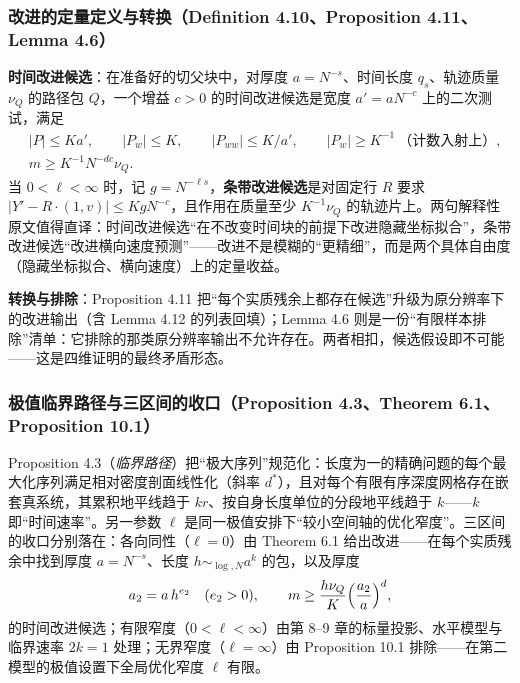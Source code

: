 \subsubsection*{改进的定量定义与转换（Definition 4.10、Proposition 4.11、Lemma 4.6）}

\textbf{时间改进候选}：在准备好的切父块中，对厚度 $a=N^{-s}$、时间长度 $q_s$、轨迹质量 $\nu_Q$ 的路径包 $Q$，一个增益 $c>0$ 的时间改进候选是宽度 $a'=aN^{-c}$ 上的二次测试，满足
\begin{equation}
\begin{aligned}
&|P|\le Ka',\qquad |P_w|\le K,\qquad |P_{ww}|\le K/a',\qquad
|P_w|\ge K^{-1}\ \text{（计数入射上）},\\
&m\ge K^{-1}N^{-dc}\nu_Q .
\end{aligned}
\end{equation}
当 $0<\ell<\infty$ 时，记 $g=N^{-\ell s}$，\textbf{条带改进候选}是对固定行 $R$ 要求 $|Y'-R\cdot(1,v)|\le KgN^{-c}$，且作用在质量至少 $K^{-1}\nu_Q$ 的轨迹片上。两句解释性原文值得直译：时间改进候选“在不改变时间块的前提下改进隐藏坐标拟合”，条带改进候选“改进横向速度预测”——改进不是模糊的“更精细”，而是两个具体自由度（隐藏坐标拟合、横向速度）上的定量收益。

\textbf{转换与排除}：Proposition 4.11 把“每个实质残余上都存在候选”升级为原分辨率下的改进输出（含 Lemma 4.12 的列表回填）；Lemma 4.6 则是一份“有限样本排除”清单：它排除的那类原分辨率输出不允许存在。两者相扣，候选假设即不可能——这是四维证明的最终矛盾形态。

\subsubsection*{极值临界路径与三区间的收口（Proposition 4.3、Theorem 6.1、Proposition 10.1）}

Proposition 4.3（\emph{临界路径}）把“极大序列”规范化：长度为一的精确问题的每个最大化序列满足相对密度剖面线性化（斜率 $d^{*}$），且对每个有限有序深度网格存在嵌套真系统，其累积地平线趋于 $kr$、按自身长度单位的分段地平线趋于 $k$——$k$ 即“时间速率”。另一参数 $\ell$ 是同一极值安排下“较小空间轴的优化窄度”。三区间的收口分别落在：各向同性（$\ell=0$）由 Theorem 6.1 给出改进——在每个实质残余中找到厚度 $a=N^{-s}$、长度 $h\sim_{\log,N}a^{k}$ 的包，以及厚度
\begin{equation}
a_2=a\,h^{e_2}\quad (e_2>0),\qquad
m\ge \frac{h\nu_Q}{K}\Bigl(\frac{a_2}{a}\Bigr)^{d},
\end{equation}
的时间改进候选；有限窄度（$0<\ell<\infty$）由第 8--9 章的标量投影、水平模型与临界速率 $2k=1$ 处理；无界窄度（$\ell=\infty$）由 Proposition 10.1 排除——在第二模型的极值设置下全局优化窄度 $\ell$ 有限。

